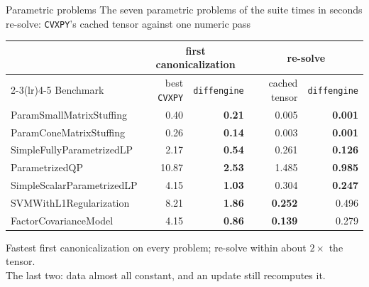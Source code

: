 \documentclass[10pt,mathserif,aspectratio=169]{beamer}
\newcommand{\de}{\texttt{diffengine}}
\newcommand{\cvxpy}{\texttt{CVXPY}}
\begin{document}
\begin{frame}{Parametric problems}
\vspace{-1ex}
{\scriptsize\color{black!55} The seven parametric problems of the suite \textbullet{} times in
seconds \textbullet{} re-solve: \cvxpy{}'s cached tensor against one numeric pass}

\vspace{1.5ex}
\begin{center}\small
\setlength{\tabcolsep}{6pt}
\begin{tabular}{@{}l rr rr@{}}
\toprule
& \multicolumn{2}{c}{first canonicalization} & \multicolumn{2}{c}{re-solve} \\
\cmidrule(lr){2-3}\cmidrule(lr){4-5}
Benchmark & best \cvxpy{} & \de{} & cached tensor & \de{} \\
\midrule
ParamSmallMatrixStuffing   &  0.40 & \textbf{0.21} & 0.005 & \textbf{0.001} \\
ParamConeMatrixStuffing    &  0.26 & \textbf{0.14} & 0.003 & \textbf{0.001} \\
SimpleFullyParametrizedLP  &  2.17 & \textbf{0.54} & 0.261 & \textbf{0.126} \\
ParametrizedQP             & 10.87 & \textbf{2.53} & 1.485 & \textbf{0.985} \\
SimpleScalarParametrizedLP &  4.15 & \textbf{1.03} & 0.304 & \textbf{0.247} \\
SVMWithL1Regularization    &  8.21 & \textbf{1.86} & \textbf{0.252} & 0.496 \\
FactorCovarianceModel      &  4.15 & \textbf{0.86} & \textbf{0.139} & 0.279 \\
\bottomrule
\end{tabular}
\end{center}

\vspace{1.5ex}
\begin{center}\small
Fastest first canonicalization on every problem; re-solve within about $2\times$ the tensor.
\\[0.4ex]
{\color{black!55}\footnotesize The last two: data almost all constant, and an update still
recomputes it.}
\end{center}
\end{frame}
\end{document}
